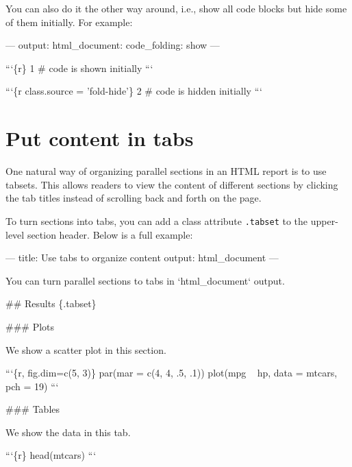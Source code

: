 \documentclass[
  11pt,
]{krantz}
\newenvironment{Shaded}{\begin{snugshade}}{\end{snugshade}}
\newcommand{\BaseNTok}[1]{\textcolor[rgb]{0.06,0.06,0.06}{#1}}
\newcommand{\FunctionTok}[1]{\textcolor[rgb]{0,0,0}{#1}}
\newcommand{\NormalTok}[1]{#1}
\begin{document}
You can also do it the other way around, i.e., show all code blocks but hide some of them initially. For example:

\begin{Shaded}
\begin{Highlighting}[]
\NormalTok{---}
\NormalTok{output:}
\NormalTok{  html_document:}
\BaseNTok{    code_folding: show}
\NormalTok{---}

\BaseNTok{```\{r\}}
\BaseNTok{1  # code is shown initially}
\BaseNTok{```}

\BaseNTok{```\{r class.source = 'fold-hide'\}}
\BaseNTok{2  # code is hidden initially}
\BaseNTok{```}
\end{Highlighting}
\end{Shaded}

\hypertarget{html-tabs}{%
\section{Put content in tabs}\label{html-tabs}}

One natural way of organizing parallel sections in an HTML report is to use tabsets. This allows readers to view the content of different sections by clicking the tab titles instead of scrolling back and forth on the page.

To turn sections into tabs, you can add a class attribute \texttt{.tabset} to the upper-level section header. Below is a full example:

\begin{Shaded}
\begin{Highlighting}[]
\NormalTok{---}
\NormalTok{title: Use tabs to organize content}
\NormalTok{output: html_document}
\NormalTok{---}

\NormalTok{You can turn parallel sections to tabs in }\BaseNTok{`html_document`}\NormalTok{ output.}

\FunctionTok{## Results \{.tabset\}}

\FunctionTok{### Plots}

\NormalTok{We show a scatter plot in this section.}

\BaseNTok{```\{r, fig.dim=c(5, 3)\}}
\BaseNTok{par(mar = c(4, 4, .5, .1))}
\BaseNTok{plot(mpg ~ hp, data = mtcars, pch = 19)}
\BaseNTok{```}

\FunctionTok{### Tables}

\NormalTok{We show the data in this tab.}

\BaseNTok{```\{r\}}
\BaseNTok{head(mtcars)}
\BaseNTok{```}
\end{Highlighting}
\end{Shaded}
\end{document}
